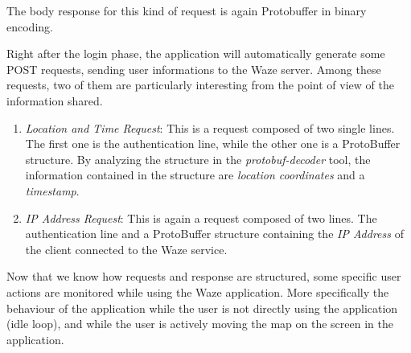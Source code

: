 			The body response for this kind of request is again Protobuffer in binary encoding.\newline
			\par Right after the login phase, the application will automatically generate some POST requests, sending user informations to the Waze server. Among these requests, two of them are particularly interesting from the point of view of the information shared.
			\begin{enumerate}
				\item \textit{Location and Time Request}: This is a request composed of two single lines. The first one is the authentication line, while the other one is a ProtoBuffer structure. By analyzing the structure in the \textit{protobuf-decoder} tool, the information contained in the structure are \textit{location coordinates} and a \textit{timestamp}.
				\item \textit{IP Address Request}: This is again a request composed of two lines. The authentication line and a ProtoBuffer structure containing the \textit{IP Address} of the client connected to the Waze service.
			\end{enumerate}

			\par Now that we know how requests and response are structured, some specific user actions are monitored while using the Waze application. More specifically the behaviour of the application while the user is not directly using the application (idle loop), and while the user is actively moving the map on the screen in the application.
			
